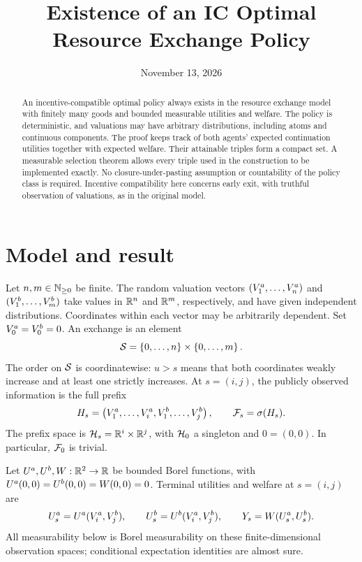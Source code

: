 \documentclass[11pt]{extarticle}
\title{Existence of an IC Optimal Resource Exchange Policy}
\author{}
\date{November 13, 2026}
\begin{document}
\maketitle
\vspace{-1.5em}

\begin{abstract}
An incentive-compatible optimal policy always exists in the resource exchange
model with finitely many goods and bounded measurable utilities and welfare.
The policy is deterministic, and valuations may have arbitrary distributions,
including atoms and continuous components. The proof keeps track of both
agents' expected continuation utilities together with expected welfare.
Their attainable triples form a compact set. A measurable selection theorem
allows every triple used in the construction to be implemented exactly.
No closure-under-pasting assumption or countability of the policy class is
required. Incentive compatibility here concerns early exit, with truthful
observation of valuations, as in the original model.
\end{abstract}

\section{Model and result}

Let $n,m\in\mathbb{N}_{\geq 0}$ be finite. The random valuation vectors
$(V^a_{1},\ldots,V^a_{n})$ and
$(V^b_{1},\ldots,V^b_{m})$ take values in $\mathbb{R}^n$ and $\mathbb{R}^m$,
respectively, and have given independent distributions. Coordinates within
each vector may be arbitrarily dependent. Set $V^a_{0}=V^b_{0}=0$.
An exchange is an element
\[
    \mathcal{S}=\left\{0,\ldots,n\right\}\times\left\{0,\ldots,m\right\}.
\]
The order on $\mathcal{S}$ is coordinatewise: $u>s$ means that both
coordinates weakly increase and at least one strictly increases.
At $s=(i,j)$, the publicly observed information is the full prefix
\[
    H_s=\left(V^a_{1},\ldots,V^a_{i},
                    V^b_{1},\ldots,V^b_{j}\right),
    \qquad \mathcal{F}_{s}=\sigma(H_s).
\]
The prefix space is $\mathcal{H}_s=\mathbb{R}^i\times\mathbb{R}^j$, with $\mathcal{H}_0$ a
singleton and $0=(0,0)$. In particular, $\mathcal{F}_0$ is trivial.

Let $U^a,U^b,W:\mathbb{R}^2\to\mathbb{R}$ be bounded Borel
functions, with $U^a(0,0)=U^b(0,0)=W(0,0)=0$.
Terminal utilities and welfare at $s=(i,j)$ are
\[
    U^a_{s}=U^a(V^a_{i},V^b_{j}),\qquad
    U^b_{s}=U^b(V^a_{i},V^b_{j}),\qquad
    Y_{s}=W(U^a_{s},U^b_{s}).
\]
All measurability below is Borel measurability on these finite-dimensional
observation spaces; conditional expectation identities are almost sure.
\end{document}
